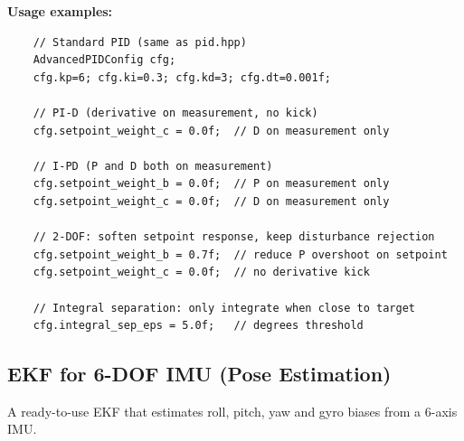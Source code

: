 \textbf{Usage examples:}
\begin{verbatim}
    // Standard PID (same as pid.hpp)
    AdvancedPIDConfig cfg;
    cfg.kp=6; cfg.ki=0.3; cfg.kd=3; cfg.dt=0.001f;

    // PI-D (derivative on measurement, no kick)
    cfg.setpoint_weight_c = 0.0f;  // D on measurement only

    // I-PD (P and D both on measurement)
    cfg.setpoint_weight_b = 0.0f;  // P on measurement only
    cfg.setpoint_weight_c = 0.0f;  // D on measurement only

    // 2-DOF: soften setpoint response, keep disturbance rejection
    cfg.setpoint_weight_b = 0.7f;  // reduce P overshoot on setpoint
    cfg.setpoint_weight_c = 0.0f;  // no derivative kick

    // Integral separation: only integrate when close to target
    cfg.integral_sep_eps = 5.0f;   // degrees threshold
\end{verbatim}

\subsection{EKF for 6-DOF IMU (Pose Estimation)}

A ready-to-use EKF that estimates roll, pitch, yaw and gyro biases from a 6-axis IMU.

